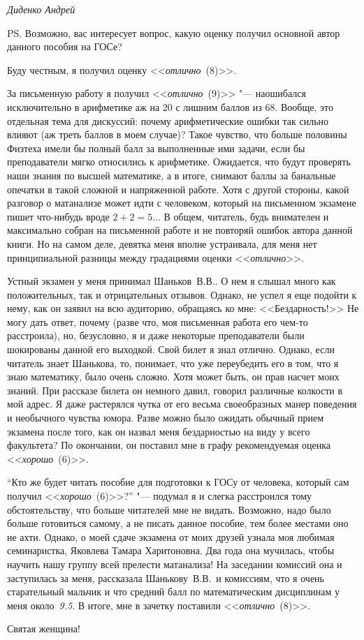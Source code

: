 \mbox{}

\noindent\textit{Диденко Андрей}

\mbox{}

PS. Возможно, вас интересует вопрос, какую оценку получил основной автор данного пособия на ГОСе? 

Буду честным, я получил оценку <<\textit{отлично}~(8)>>. 

За письменную работу я получил <<\textit{отлично}~(9)>> "--- наошибался исключительно в арифметике аж на 20 с лишним баллов из 68. Вообще, это отдельная тема для дискуссий: почему арифметические ошибки так сильно влияют (аж треть баллов в моем случае)? Такое чувство, что больше половины Физтеха имели бы полный балл за выполненные ими задачи, если бы преподаватели мягко относились к арифметике. Ожидается, что будут проверять наши знания по высшей математике, а в итоге, снимают баллы за банальные опечатки в такой сложной и напряженной работе. Хотя с другой стороны, какой разговор о матанализе может идти с человеком, который на письменном экзамене пишет что-нибудь вроде $2 + 2 = 5$... В общем, читатель, будь внимателен и максимально собран на письменной работе и не повторяй ошибок автора данной книги. Но на самом деле, девятка меня вполне устраивала, для меня нет принципиальной разницы между градациями оценки <<\textit{отлично}>>.

Устный экзамен у меня принимал Шаньков~В.В.. О нем я слышал много как положительных, так и отрицательных отзывов. Однако, не успел я еще подойти к нему, как он заявил на всю аудиторию, обращаясь ко мне: <<Бездарность!>> Не могу дать ответ, почему (разве что, моя письменная работа его чем-то расстроила), но, безусловно, я и даже некоторые преподаватели были шокированы данной его выходкой. Свой билет я знал отлично. Однако, если читатель знает Шанькова, то, понимает, что уже переубедить его в том, что я знаю математику, было очень сложно. Хотя может быть, он прав насчет моих знаний. При рассказе билета он немного давил, говорил различные колкости в мой адрес. Я даже растерялся чутка от его весьма своеобразных манер поведения и необычного чувства юмора. Разве можно было ожидать обычный прием экзамена после того, как он назвал меня бездарностью на виду у всего факультета? По окончании, он поставил мне в графу рекомендуемая оценка <<\textit{хорошо}~(6)>>. 

``Кто же будет читать пособие для подготовки к ГОСу от человека, который сам получил <<\textit{хорошо}~(6)>>?'' "--- подумал я и слегка расстроился тому обстоятельству, что больше читателей мне не видать. Возможно, надо было больше готовиться самому, а не писать данное пособие, тем более местами оно не ахти. Однако, о моей сдаче экзамена от моих друзей узнала моя любимая семинаристка, Яковлева Тамара Харитоновна. Два года она мучилась, чтобы научить нашу группу всей прелести матанализа! На заседании комиссий она и заступилась за меня, рассказала Шанькову~В.В.~и комиссиям, что я очень старательный мальчик и что средний балл по математическим дисциплинам у меня около~\textit{9.5}. В итоге, мне в зачетку поставили <<\textit{отлично}~(8)>>. 

Святая женщина!